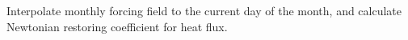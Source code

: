 
Interpolate monthly forcing field to the current day of the month, 
and calculate Newtonian restoring coefficient for heat flux.
